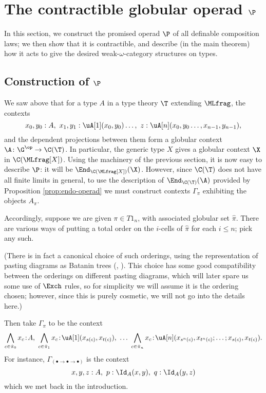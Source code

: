\section{The contractible globular operad \texorpdfstring{$\P$}{P\_ML\_Id}} \label{sec:the-operad}

\noindent In this section, we construct the promised operad $\P$ of all definable composition laws; we then show that it is contractible, and describe (in the main theorem) how it acts to give the desired weak-$\omega$-category structures on types.

\subsection{Construction of \texorpdfstring{$\P$}{P\_ML\_Id}}

We saw above that for a type $A$ in a type theory $\T$ extending $\MLfrag$, the contexts
\[x_0,y_0:A,\ x_1,y_1:\uA[1](x_0,y_0)\ldots,\ z:\uA[n](x_0,y_0\ldots,
x_{n-1},y_{n-1}),
\]
and the dependent projections between them form a globular context $\A \colon  \G^\op \to \C(\T)$.  In particular, the generic type $X$ gives a globular context $\X$ in $\C(\MLfrag[X])$.  Using the machinery of the previous section, it is now easy to describe $\P$: it will be $\End_{\C(\MLfrag[X])}(\X)$.  However, since $\C(\T)$ does not have all finite limits in general, to use the description of $\End_{\C(\T)}(\A)$ provided by Proposition \ref{prop:endo-operad} we must construct contexts $\Gamma_\pi$ exhibiting the objects $A_\pi$.

Accordingly, suppose we are given $\pi \in T1_n$, with associated globular set $\hat{\pi}$.  There are various ways of putting a total order on the $i$-cells of $\hat{\pi}$ for each $i \leq n$; pick any such.

(There is in fact a canonical choice of such orderings, using the representation of pasting diagrams as Batanin trees (\cite{batanin:natural-environment}, \cite[8.1]{leinster:book}).  This choice has some good compatibility between the orderings on different pasting diagrams, which will later spare us some use of $\Exch$ rules, so for simplicity we will assume it is the ordering chosen; however, since this is purely cosmetic, we will not go into the details here.)

Then take $\Gamma_\pi$ to be the context
\[\bigwedge_{c \in \hat{\pi}_0} x_c\! :\! A,\ \bigwedge_{c \in
\hat{\pi}_1} x_c\! :\! \uA[1](x_{s(c)},x_{t(c)}),\ \ldots\
\bigwedge_{c \in \hat{\pi}_n} x_c\! :\! \uA[n](x_{s^n(c)},x_{t^n(c)};
\ldots;x_{s(c)},x_{t(c)}).
\]
For instance, $\Gamma_{(\bullet \to \bullet \to \bullet)}$ is the context
\[x,y,z:A,\ p:\Id_A(x,y),\ q:\Id_A(y,z)\]
which we met back in the introduction.

